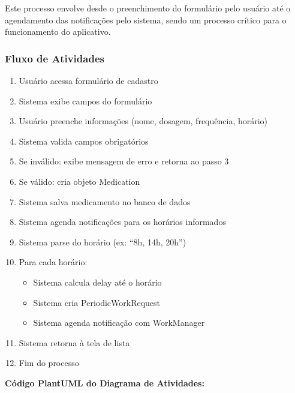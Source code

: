 \documentclass[12pt]{article}
\begin{document}
Este processo envolve desde o preenchimento do formulário pelo usuário até o agendamento das notificações pelo sistema, sendo um processo crítico para o funcionamento do aplicativo.

\subsubsection{Fluxo de Atividades}

\begin{enumerate}
    \item Usuário acessa formulário de cadastro
    \item Sistema exibe campos do formulário
    \item Usuário preenche informações (nome, dosagem, frequência, horário)
    \item Sistema valida campos obrigatórios
    \item Se inválido: exibe mensagem de erro e retorna ao passo 3
    \item Se válido: cria objeto Medication
    \item Sistema salva medicamento no banco de dados
    \item Sistema agenda notificações para os horários informados
    \item Sistema parse do horário (ex: ``8h, 14h, 20h'')
    \item Para cada horário:
    \begin{itemize}
        \item Sistema calcula delay até o horário
        \item Sistema cria PeriodicWorkRequest
        \item Sistema agenda notificação com WorkManager
    \end{itemize}
    \item Sistema retorna à tela de lista
    \item Fim do processo
\end{enumerate}


\textbf{Código PlantUML do Diagrama de Atividades:}
\end{document}
